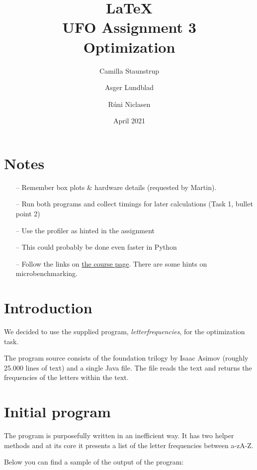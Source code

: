 \documentclass[english]{article}
\begin{document}
\title{\LaTeX \\ UFO Assignment 3 \\ Optimization}
\author{Camilla Staunstrup \and Asger Lundblad \and Rúni Niclasen}
\date{April 2021}
\maketitle

\tableofcontents

\section*{Notes}
\begin{itemize}
    \item[--] Remember box plots \& hardware details (requested by Martin). 
    \item[--] Run both programs and collect timings for later calculations (Task 1, bullet point 2)
    \item[--] Use the profiler as hinted in the assignment  
    \item[--] This could probably be done even faster in Python
    \item[--] Follow the links on \href{https://datsoftlyngby.github.io/soft2021spring/UFO/week-14/#3-performance-and-optimization}{the course page}. There are some hints on microbenchmarking.
\end{itemize}

\pagebreak

\section{Introduction}

We decided to use the supplied program, \emph{letterfrequencies}, for the optimization task.

The program source consists of the foundation trilogy by Isaac Asimov (roughly 25.000 lines of text) and a single Java file.
The file reads the text and returns the frequencies of the letters within the text.

\section{Initial program}
The program is purposefully written in an inefficient way. It has two helper methods and at its core it presents a list of the letter frequencies between a-zA-Z. 

Below you can find a sample of the output of the program:
\end{document}
